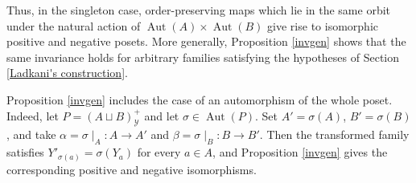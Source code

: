 Thus, in the singleton case, order-preserving maps which lie in the same orbit under the natural action of $\operatorname{Aut} (A)\times \operatorname{Aut}(B)$ give rise to isomorphic positive and negative posets. More generally, Proposition \ref{invgen} shows that the same invariance holds for arbitrary families satisfying the hypotheses of Section \ref{Ladkani's construction}.

\begin{remark}
    Proposition \ref{invgen} includes the case of an automorphism of the whole poset. Indeed, let $P=(A \sqcup B)_{\mathcal{Y}}^+$ and let $\sigma \in \operatorname{Aut}(P)$. Set $A'=\sigma (A)$, $B'=\sigma(B)$, and take $\alpha=\sigma \mid_A \colon A \to A'$ and $\beta=\sigma \mid_B \colon B \to B'$. Then the transformed family satisfies $Y'_{\sigma(a)}=\sigma(Y_a)$ for every $a \in A$, and Proposition \ref{invgen} gives the corresponding positive and negative isomorphisms.
\end{remark}